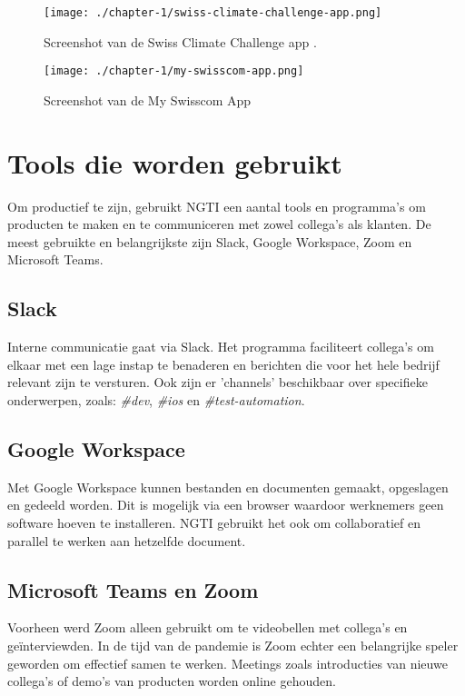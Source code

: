 \begin{figure}[hbt!]
  \centering
  \begin{minipage}{0.45\textwidth}
      \centering
      \texttt{[image: ./chapter-1/swiss-climate-challenge-app.png]}
      \caption{Screenshot van de Swiss Climate Challenge app \cite{ngti-swisscom-climate-challenge}.}
      \label{fig:swiss-climate-challenge-app}
  \end{minipage}\hfill
  \begin{minipage}{0.45\textwidth}
      \centering
      \texttt{[image: ./chapter-1/my-swisscom-app.png]}
      \caption{Screenshot van de My Swisscom App \cite{ngti-my-swisscom-app}}
      \label{fig:my-swisscom-app}
  \end{minipage}
\end{figure}


\section{Tools die worden gebruikt}\label{sec:tools-die-gebruikt-worden}
Om productief te zijn, gebruikt NGTI een aantal tools en programma's om producten te maken en te communiceren met zowel collega's als klanten. De meest gebruikte en belangrijkste zijn Slack, Google Workspace, Zoom en Microsoft Teams.

\subsection{Slack}\label{subsec:slack}
Interne communicatie gaat via Slack. Het programma faciliteert collega's om elkaar met een lage instap te benaderen en berichten die voor het hele bedrijf relevant zijn te versturen. Ook zijn er 'channels' beschikbaar over specifieke onderwerpen, zoals: \textit{\#dev}, \textit{\#ios} en \textit{\#test-automation}.

\subsection{Google Workspace}\label{subsec:google-workspace}
Met Google Workspace kunnen bestanden en documenten gemaakt, opgeslagen en gedeeld worden. Dit is mogelijk via een browser waardoor werknemers geen software hoeven te installeren. NGTI gebruikt het ook om collaboratief en parallel te werken aan hetzelfde document.

\subsection{Microsoft Teams en Zoom}\label{subsec:microsoft-teams-en-zoom}
Voorheen werd Zoom alleen gebruikt om te videobellen met collega's en geïnterviewden. In de tijd van de pandemie is Zoom echter een belangrijke speler geworden om effectief samen te werken. Meetings zoals introducties van nieuwe collega's of demo's van producten worden online gehouden.

